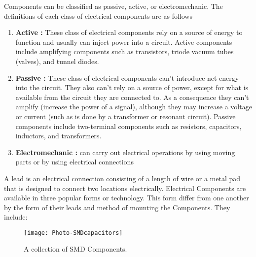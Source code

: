 Components can be classified as passive, active, or electromechanic. The definitions of each class of electrical components are as follows
\begin{enumerate}
\item \textbf{Active :} These class of electrical components rely on a source of energy to function and usually can inject power into a circuit. Active components include amplifying components such as transistors, triode vacuum tubes (valves), and tunnel diodes.
\item \textbf{Passive :} These class of electrical components can't introduce net energy into the circuit. They also can't rely on a source of power, except for what is available from the  circuit they are connected to. As a consequence they can't amplify (increase the power of a signal), although they may increase a voltage or current (such as is done by a transformer or resonant circuit). Passive components include two-terminal components such as resistors, capacitors, inductors, and transformers.
\item \textbf{Electromechanic :}  can carry out electrical operations by using moving parts or by using electrical connections
\end{enumerate}

A lead  is an electrical connection consisting of a length of wire or a metal pad that is designed to connect two locations electrically. Electrical Components are available in three popular forms or technology. This form differ from one another by the form of their leads and method of mounting the Components. They include:



\begin{figure}[p]
\texttt{[image: Photo-SMDcapacitors]}
\centering
\caption{A collection of SMD Components.}
\centering
\label{fig:smd1}


\end{figure}

